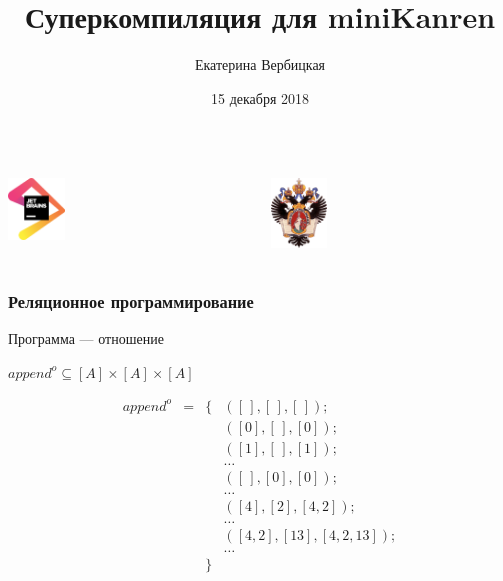 \documentclass{beamer}
\title[]{Суперкомпиляция для miniKanren}
\institute[]{
Лаборатория языковых инструментов JetBrains
\\
Санкт-Петербургский государственный университет }
\author[Екатерина Вербицкая]{Екатерина Вербицкая}
\date{15 декабря 2018}
\begin{document}
{

\begin{frame}
  \begin{columns} 
    \begin{column}{4.1cm}
      \begin{center} 
        {\includegraphics[width=1.5cm]{pics/jb.png}} 
      \end{center}
    \end{column}
    \begin{column}{4.1cm}
      \begin{center} 
        {\includegraphics[width=1.5cm]{pics/SPbGU_Logo.png}} 
      \end{center}
    \end{column}
  \end{columns}

  \titlepage
\end{frame}
}

\begin{frame}[fragile]
  \transwipe[direction=90]
  \frametitle{Реляционное программирование}
  Программа --- отношение 
  
\begin{center}
$append^{o} \subseteq [A] \times [A] \times [A] $ 

$$
\begin{array}{lrcl}
append^{o} & = & \{ & ([\,], [\,], [\,]); \\
           &   &    & ([0], [\,], [0]); \\ 
           &   &    & ([1], [\,], [1]); \\
           &   &    & \dots \\
           &   &    & ([\,], [0], [0]); \\
           &   &    & \dots \\
           &   &    & ([4], [2], [4, 2]); \\
           &   &    & \dots \\
           &   &    & ([4, 2], [13], [4, 2, 13]); \\
           &   &    & \dots \\
           &   & \}
\end{array}
$$ 
\end{center}
\end{frame}
\end{document}
